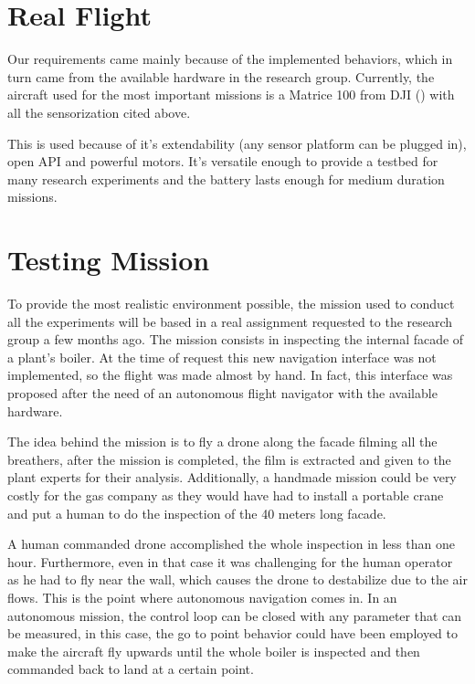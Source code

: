 \section{Real Flight} \label{ch_5:sect:real_flight}

  Our requirements came mainly because of the implemented behaviors, which in turn came from the available hardware in the research group. Currently, the aircraft used for the most important missions is a Matrice 100 from DJI (\cite{dji_matrice_web}) with all the sensorization cited above.

  This is used because of it's extendability (any sensor platform can be plugged in), open API and powerful motors. It's versatile enough to provide a testbed for many research experiments and the battery lasts enough for medium duration missions.

\section{Testing Mission} \label{ch_5:sect:testing_mission}

  To provide the most realistic environment possible, the mission used to conduct all the experiments will be based in a real assignment requested to the research group a few months ago. The mission consists in inspecting the internal facade of a plant's boiler. At the time of request this new navigation interface was not implemented, so the flight was made almost by hand. In fact, this interface was proposed after the need of an autonomous flight navigator with the available hardware.

  The idea behind the mission is to fly a drone along the facade filming all the breathers, after the mission is completed, the film is extracted and given to the plant experts for their analysis. Additionally, a handmade mission could be very costly for the gas company as they would have had to install a portable crane and put a human to do the inspection of the 40 meters long facade.

  A human commanded drone accomplished the whole inspection in less than one hour. Furthermore, even in that case it was challenging for the human operator as he had to fly near the wall, which causes the drone to destabilize due to the air flows. This is the point where autonomous navigation comes in. In an autonomous mission, the control loop can be closed with any parameter that can be measured, in this case, the go to point behavior could have been employed to make the aircraft fly upwards until the whole boiler is inspected and then commanded back to land at a certain point.

